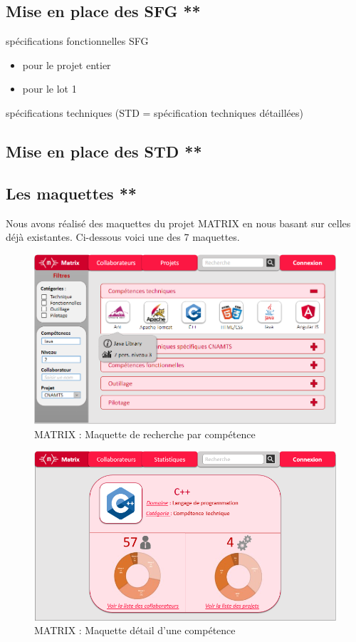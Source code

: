 \subsection{Mise en place des SFG **}

spécifications fonctionnelles SFG
\begin{itemize}
\item pour le projet entier
\item pour le lot 1
\end{itemize}
spécifications techniques (STD = spécification techniques détaillées)

\subsection{Mise en place des STD **}

\subsection{Les maquettes **}

Nous avons réalisé des maquettes du projet MATRIX en nous basant sur celles déjà existantes. Ci-dessous voici une des 7 maquettes.

\begin{figure}[!h]
\centering
\includegraphics[width=1\textwidth]{images/matrix-maquette.png}
\caption{MATRIX : Maquette de recherche par compétence}
\end{figure}

\begin{figure}[!h]
\centering
\includegraphics[width=1\textwidth]{images/matrix-maquette-competence.png}
\caption{MATRIX : Maquette détail d'une compétence}
\end{figure}


